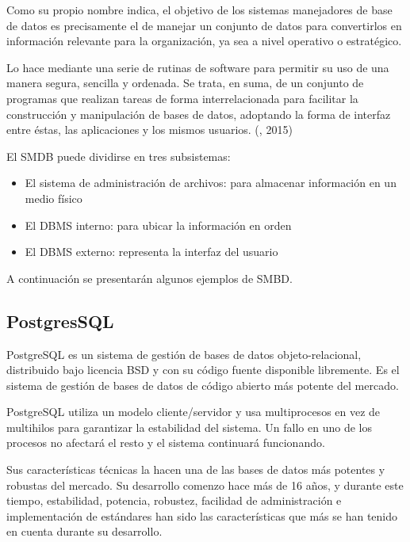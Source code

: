 Como su propio nombre indica, el objetivo de los sistemas manejadores de base de datos es precisamente el de manejar un conjunto de datos para convertirlos en información relevante para la organización, ya sea a nivel operativo o estratégico.
 
Lo hace mediante una serie de rutinas de software para permitir su uso de una manera segura, sencilla y ordenada. Se trata, en suma, de un conjunto de programas que realizan tareas de forma interrelacionada para facilitar la construcción y manipulación de bases de datos, adoptando la forma de interfaz entre éstas, las aplicaciones y los mismos usuarios. (\citet{smdbbib}, 2015)

El SMDB puede dividirse en tres subsistemas:
\setlength{\parskip}{0mm}
\begin{itemize}

    \item El sistema de administración de archivos: para almacenar información en un medio físico
    
    \item El DBMS interno: para ubicar la información en orden
    
    \item El DBMS externo: representa la interfaz del usuario

\end{itemize}



\setlength{\parskip}{5mm}
A continuación se presentarán algunos ejemplos de SMBD.
\setlength{\parskip}{0mm}

\subsection {PostgresSQL}
\setlength{\parskip}{5mm}
PostgreSQL es un sistema de gestión de bases de datos objeto-relacional, distribuido bajo licencia BSD y con su código fuente disponible libremente. Es el sistema de gestión de bases de datos de código abierto más potente del mercado.

PostgreSQL utiliza un modelo cliente/servidor y usa multiprocesos en vez de multihilos para garantizar la estabilidad del sistema. Un fallo en uno de los procesos no afectará el resto y el sistema continuará funcionando.

Sus características técnicas la hacen una de las bases de datos más potentes y robustas del mercado. Su desarrollo comenzo hace más de 16 años, y durante este tiempo, estabilidad, potencia, robustez, facilidad de administración e implementación de estándares han sido las características que más se han tenido en cuenta durante su desarrollo.

